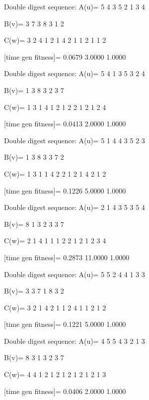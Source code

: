 Double digest sequence:
A(u)=
     5     4     3     5     2     1     3     4

B(v)=
     3     7     3     8     3     1     2

C(w)=
     3     2     4     1     2     1     4     2     1     1     2     1     1     2

[time gen fitness]=
    0.0679    3.0000    1.0000

Double digest sequence:
A(u)=
     5     4     1     3     5     3     2     4

B(v)=
     1     3     8     3     2     3     7

C(w)=
     1     3     1     4     1     2     1     2     2     1     2     1     2     4

[time gen fitness]=
    0.0413    2.0000    1.0000

Double digest sequence:
A(u)=
     5     1     4     4     3     5     2     3

B(v)=
     1     3     8     3     3     7     2

C(w)=
     1     3     1     1     4     2     2     1     2     1     4     2     1     2

[time gen fitness]=
    0.1226    5.0000    1.0000

Double digest sequence:
A(u)=
     2     1     4     3     5     3     5     4

B(v)=
     8     1     3     2     3     3     7

C(w)=
     2     1     4     1     1     1     2     2     1     2     1     2     3     4

[time gen fitness]=
    0.2873   11.0000    1.0000

Double digest sequence:
A(u)=
     5     5     2     4     4     1     3     3

B(v)=
     3     3     7     1     8     3     2

C(w)=
     3     2     1     4     2     1     1     2     4     1     1     2     1     2

[time gen fitness]=
    0.1221    5.0000    1.0000

Double digest sequence:
A(u)=
     4     5     5     4     3     2     1     3

B(v)=
     8     3     1     3     2     3     7

C(w)=
     4     4     1     2     1     2     1     2     1     2     1     2     1     3

[time gen fitness]=
    0.0406    2.0000    1.0000


